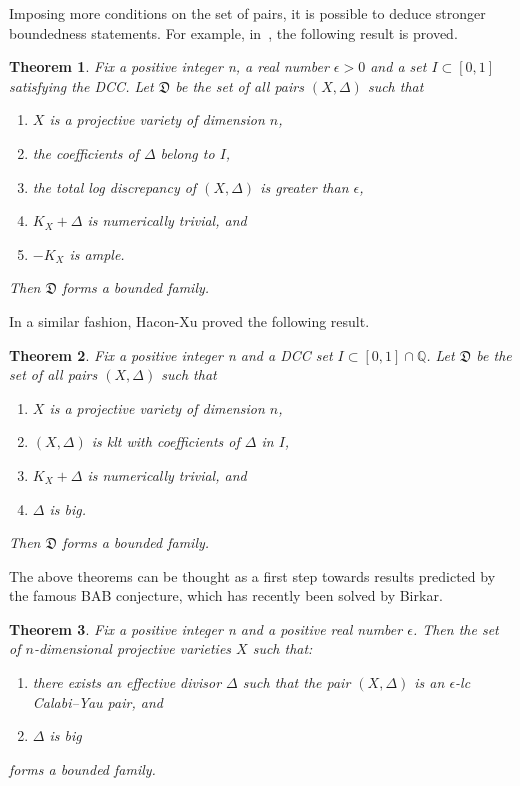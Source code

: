 \documentclass{amsart}[12pt,a4paper]
\newtheorem{theorem}{Theorem}[section]
\theoremstyle{definition}
\newcommand{\qq}{\mathbb{Q}}
\newcommand{\D}{\mathfrak{D}}
\begin{document}
Imposing more conditions on the set of pairs, it is possible to deduce stronger boundedness statements. 
For example, in~\cite{HMX14}, the following result is proved.

\begin{theorem}
\cite[Theorem~1.7]{HMX14}
\label{hmx_1.7.thm}
	Fix a positive integer n, a real number $\epsilon>0$ and a set $I \subset [0,1]$ satisfying the DCC. 
	Let $\D$ be the set of all pairs $(X, \Delta)$ such that
	\begin{enumerate}
		\item $X$ is a projective variety of dimension $n$,
		\item the coefficients of $\Delta$ belong to $I$,
		\item the total log discrepancy of $(X, \Delta)$ is greater than $\epsilon$,
		\item $K_X+\Delta$ is numerically trivial, and
		\item $-K_X$ is ample.
	\end{enumerate}
	Then $\D$ forms a bounded family.
\end{theorem}

In a similar fashion, Hacon-Xu proved the following result.

\begin{theorem}
\cite[Theorem~1.3]{HX14}
\label{hx.thm}
	Fix a positive integer n and a DCC set $I \subset [0,1]\cap\qq$. Let $\D$ be the set of all pairs $(X, \Delta)$ such that
	\begin{enumerate}
		\item $X$ is a projective variety of dimension $n$,
		\item $(X,\Delta)$ is klt with coefficients of $\Delta$ in $I$,
		\item $K_X+\Delta$ is numerically trivial, and
		\item $\Delta$ is big.
	\end{enumerate}
	Then $\D$ forms a bounded family.
\end{theorem}

The above theorems can be thought as a first step towards results predicted by the famous BAB conjecture, which has recently been solved by Birkar.

\begin{theorem}
\cite[Corollary~1.2]{bir16bab}
\label{bab.thm}
		Fix a positive integer n and a positive real number $\epsilon$.
	Then the set of $n$-dimensional projective varieties $X$ such that:
	\begin{enumerate}
	\item there exists an effective divisor $\Delta$ such that the pair $(X, \Delta)$ is an $\epsilon$-lc Calabi--Yau pair, and 
	\item $\Delta$ is big
	\end{enumerate}
forms a bounded family.
\end{theorem}
\end{document}

